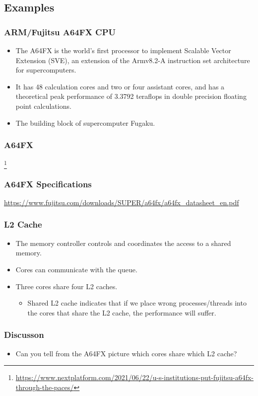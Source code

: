 \documentclass{beamer}
\begin{document}
\begin{CJK}{UTF8}{bsmi}
\subsection{Examples}

\begin{frame}
\frametitle{ARM/Fujitsu A64FX CPU} 
\begin{itemize}
\item The A64FX is the world's first processor to implement Scalable
  Vector Extension (SVE), an extension of the Armv8.2-A instruction
  set architecture for supercomputers.
\item It has 48 calculation cores and two or four assistant cores, and
  has a theoretical peak performance of 3.3792 teraflops in double
  precision floating point calculations.
\item The building block of supercomputer Fugaku. 
\end{itemize}
\end{frame}

\begin{frame}
\frametitle{A64FX}
\centerline{}
\footnote{\url{https://www.nextplatform.com/2021/06/22/u-s-institutions-put-fujitsu-a64fx-through-the-paces/}}
\end{frame}

\begin{frame}
\frametitle{A64FX Specifications}
\url{https://www.fujitsu.com/downloads/SUPER/a64fx/a64fx_datasheet_en.pdf}
\end{frame}

\begin{frame}
\frametitle{L2 Cache}
\begin{itemize}
\item The memory controller controls and coordinates the access to a shared memory.
\item Cores can communicate with the queue.  
\item Three cores share four L2 caches.  
  \begin{itemize}
    \item Shared L2 cache indicates that if we place wrong
      processes/threads into the cores that share the L2 cache, the
      performance will suffer.
  \end{itemize}
\end{itemize}
\end{frame}

\begin{frame}
\frametitle{Discusson}
\begin{itemize}
\item Can you tell from the A64FX picture which cores share which L2 cache?
\end{itemize}
\end{frame}



\end{CJK}
\end{document}
